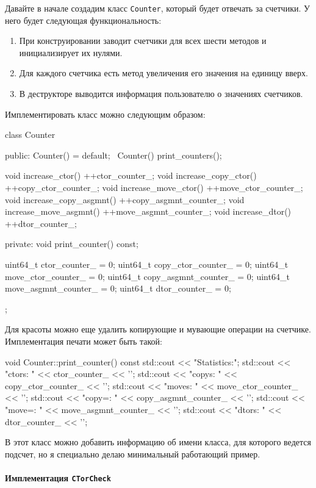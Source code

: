 Давайте в начале создадим класс \verb"Counter", который будет отвечать за счетчики.
У него будет следующая функциональность:
\begin{enumerate}
\item При конструировании заводит счетчики для всех шести методов и инициализирует их нулями.

\item Для каждого счетчика есть метод увеличения его значения на единицу вверх.

\item В деструкторе выводится информация пользователю о значениях счетчиков.
\end{enumerate}
Имплементировать класс можно следующим образом:
\begin{cppcode}
class Counter {
public:
  Counter() = default;
  ~Counter() {
    print_counters();
  }

  void increase_ctor() {
    ++ctor_counter_;
  }
  void increase_copy_ctor() {
    ++copy_ctor_counter_;
  }
  void increase_move_ctor() {
    ++move_ctor_counter_;
  }
  void increase_copy_asgmnt() {
    ++copy_asgmnt_counter_;
  }
  void increase_move_asgmnt() {
    ++move_asgmnt_counter_;
  }
  void increase_dtor() {
    ++dtor_counter_;
  }
  
private:
  void print_counter() const;

  uint64_t ctor_counter_ = 0;
  uint64_t copy_ctor_counter_ = 0;
  uint64_t move_ctor_counter_ = 0;
  uint64_t copy_asgmnt_counter_ = 0;
  uint64_t move_asgmnt_counter_ = 0;
  uint64_t dtor_counter_ = 0;
};
\end{cppcode}
Для красоты можно еще удалить копирующие и мувающие операции на счетчике.
Имплементация печати может быть такой:
\begin{cppcode}
void Counter::print_counter() const {
  std::cout << "Statistics:\n";
  std::cout << "ctors: " << ctor_counter_ << '\n';
  std::cout << "copys: " << copy_ctor_counter_ << '\n';
  std::cout << "moves: " << move_ctor_counter_ << '\n';
  std::cout << "copy=: " << copy_asgmnt_counter_ << '\n';
  std::cout << "move=: " << move_asgmnt_counter_ << '\n';
  std::cout << "dtors: " << dtor_counter_ << '\n';
}
\end{cppcode}
В этот класс можно добавить информацию об имени класса, для которого ведется подсчет, но я специально делаю минимальный работающий пример.

\paragraph{Имплементация \texttt{CTorCheck}}

